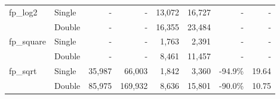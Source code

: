 \begin{table}
\begin{tabular}{l|l||rr||rr||rr}
\multirow{2}{*}{fp\_log2}   & Single                                          & -                           & -                                & 13,072                      & 16,727                           & -                       & -                       \\
                            & Double                                          & -                           & -                                & 16,355                      & 23,484                           & -                       & -                       \\ \hline \hline
\multirow{2}{*}{fp\_square} & Single                                          & -                           & -                                & 1,763                       & 2,391                            & -                       & -                       \\
                            & Double                                          & -                           & -                                & 8,461                       & 11,457                           & -                       & -                       \\ \hline \hline
\multirow{2}{*}{fp\_sqrt}   & Single                                          & 35,987                      & 66,003                           & 1,842                       & 3,360                            & -94.9\%                 & 19.64                   \\
                            & Double                                          & 85,975                      & 169,932                          & 8,636                       & 15,801                           & -90.0\%                 & 10.75
\end{tabular}

\end{table}
